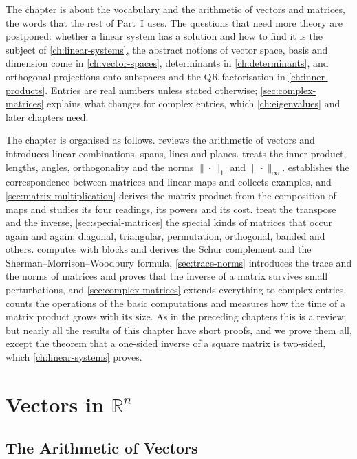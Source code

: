 The chapter is about the vocabulary and the arithmetic of vectors and matrices, the words that the rest of Part~I uses. The questions that need more theory are postponed: whether a linear system has a solution and how to find it is the subject of \cref{ch:linear-systems}, the abstract notions of vector space, basis and dimension come in \cref{ch:vector-spaces}, determinants in \cref{ch:determinants}, and orthogonal projections onto subspaces and the QR factorisation in \cref{ch:inner-products}. Entries are real numbers unless stated otherwise; \cref{sec:complex-matrices} explains what changes for complex entries, which \cref{ch:eigenvalues} and later chapters need.

The chapter is organised as follows.  reviews the arithmetic of vectors and introduces linear combinations, spans, lines and planes.  treats the inner product, lengths, angles, orthogonality and the norms $\|\cdot\|_1$ and $\|\cdot\|_\infty$.  establishes the correspondence between matrices and linear maps and collects examples, and \cref{sec:matrix-multiplication} derives the matrix product from the composition of maps and studies its four readings, its powers and its cost.  treat the transpose and the inverse, \cref{sec:special-matrices} the special kinds of matrices that occur again and again: diagonal, triangular, permutation, orthogonal, banded and others.  computes with blocks and derives the Schur complement and the Sherman--Morrison--Woodbury formula, \cref{sec:trace-norms} introduces the trace and the norms of matrices and proves that the inverse of a matrix survives small perturbations, and \cref{sec:complex-matrices} extends everything to complex entries.  counts the operations of the basic computations and measures how the time of a matrix product grows with its size. As in the preceding chapters this is a review; but nearly all the results of this chapter have short proofs, and we prove them all, except the theorem that a one-sided inverse of a square matrix is two-sided, which \cref{ch:linear-systems} proves.

\section{Vectors in \texorpdfstring{$\mathbb R^n$}{R\^{}n}}
\label{sec:vectors-in-rn}

\subsection{The Arithmetic of Vectors}

